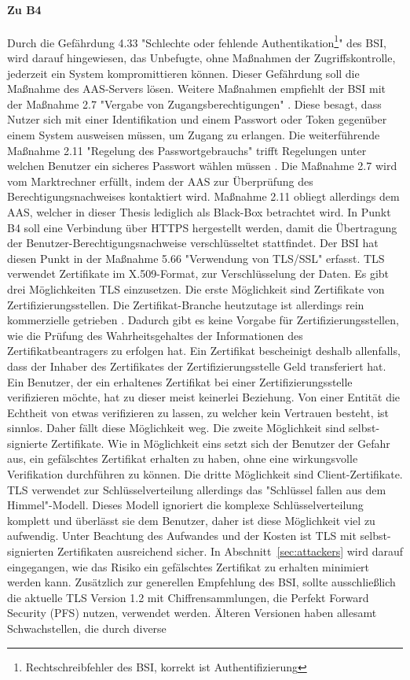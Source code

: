 \documentclass[11pt,a4paper]{report}
\begin{document}
\paragraph{Zu B4} Durch die Gefährdung 4.33 "Schlechte oder fehlende Authentikation\footnote{Rechtschreibfehler des BSI, korrekt ist Authentifizierung}" \cite{bsi_g4033} des BSI, wird darauf hingewiesen, das Unbefugte, ohne Maßnahmen der Zugriffskontrolle, jederzeit ein System kompromittieren können. Dieser Gefährdung soll die Maßnahme des AAS-Servers lösen. Weitere Maßnahmen empfiehlt der BSI mit der Maßnahme 2.7 "Vergabe von Zugangsberechtigungen" \cite{bsi_m2007}. Diese besagt, dass Nutzer sich mit einer Identifikation und einem Passwort oder Token gegenüber einem System ausweisen müssen, um Zugang zu erlangen. Die weiterführende Maßnahme 2.11 "Regelung des Passwortgebrauchs" trifft Regelungen unter welchen Benutzer ein sicheres Passwort wählen müssen \cite{bsi_m2011}. Die Maßnahme 2.7 wird vom Marktrechner erfüllt, indem der AAS zur Überprüfung des Berechtigungsnachweises kontaktiert wird. Maßnahme 2.11 obliegt allerdings dem AAS, welcher in dieser Thesis lediglich als Black-Box betrachtet wird. In Punkt B4 soll eine Verbindung über HTTPS hergestellt werden, damit die Übertragung der Benutzer-Berechtigungsnachweise verschlüsseltet stattfindet. Der BSI hat diesen Punkt in der Maßnahme 5.66 "Verwendung von TLS/SSL" \cite{bsi_m5066} erfasst. TLS verwendet Zertifikate im X.509-Format, zur Verschlüsselung der Daten. Es gibt drei Möglichkeiten TLS einzusetzen. Die erste Möglichkeit sind Zertifikate von Zertifizierungsstellen. Die Zertifikat-Branche heutzutage ist allerdings rein kommerzielle getrieben \cite[s.~50]{gutmann}. Dadurch gibt es keine Vorgabe für Zertifizierungsstellen, wie die Prüfung des Wahrheitsgehaltes der Informationen des Zertifikatbeantragers zu erfolgen hat. Ein Zertifikat bescheinigt deshalb allenfalls, dass der Inhaber des Zertifikates der Zertifizierungsstelle Geld transferiert hat. Ein Benutzer, der ein erhaltenes Zertifikat bei einer Zertifizierungsstelle verifizieren möchte, hat zu dieser meist keinerlei Beziehung. Von einer Entität die Echtheit von etwas verifizieren zu lassen, zu welcher kein Vertrauen besteht, ist sinnlos. Daher fällt diese Möglichkeit weg. Die zweite Möglichkeit sind selbst-signierte Zertifikate. Wie in Möglichkeit eins setzt sich der Benutzer der Gefahr aus, ein gefälschtes Zertifikat erhalten zu haben, ohne eine wirkungsvolle Verifikation durchführen zu können. Die dritte Möglichkeit sind Client-Zertifikate. TLS verwendet zur Schlüsselverteilung allerdings das "Schlüssel fallen aus dem Himmel"-Modell. Dieses Modell ignoriert die komplexe Schlüsselverteilung komplett und überlässt sie dem Benutzer, daher ist diese Möglichkeit viel zu aufwendig. Unter Beachtung des Aufwandes und der Kosten ist TLS mit selbst-signierten Zertifikaten ausreichend sicher. In Abschnitt~\ref{sec:attackers} wird darauf eingegangen, wie das Risiko ein gefälschtes Zertifikat zu erhalten minimiert werden kann. Zusätzlich zur generellen Empfehlung des BSI, sollte ausschließlich die aktuelle TLS Version 1.2 mit Chiffrensammlungen, die Perfekt Forward Security (PFS) nutzen, verwendet werden. Älteren Versionen haben allesamt Schwachstellen, die durch diverse 
\end{document}
